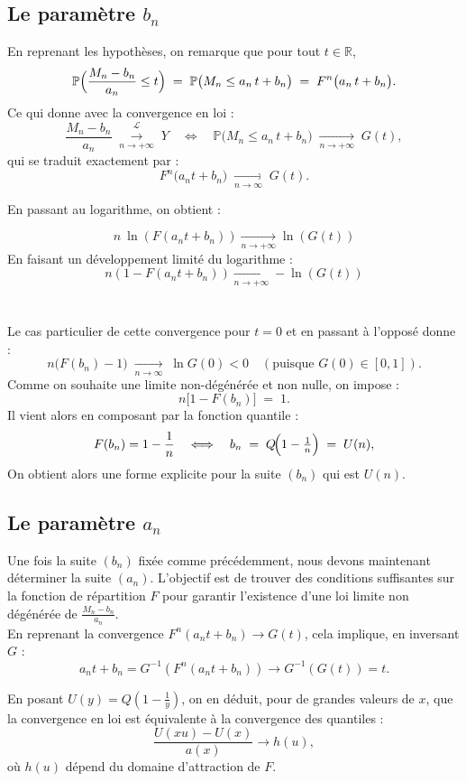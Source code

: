 \documentclass{article}
\theoremstyle{plain}
\theoremstyle{definition}
\theoremstyle{plain}
\begin{document}
\subsection{Le paramètre $b_n$}

\noindent En reprenant les hypothèses, on remarque que pour tout $t\in\mathbb R$,
\[
\mathbb{P}  \Bigl(\frac{M_n - b_n}{a_n} \le t\Bigr)
\;=\;
\mathbb{P} \bigl(M_n \le a_n\,t + b_n\bigr)
\;=\;
F^{n}\bigl(a_n\,t + b_n\bigr).
\]
Ce qui donne avec la convergence en loi :
\[
\frac{M_n - b_n}{a_n}\;\overset{\mathcal{L}}{\xrightarrow[n\to +\infty]{}}\;Y
\quad\Longleftrightarrow\quad
\mathbb{P} \bigl(M_n \le a_n\,t + b_n\bigr)
\;\xrightarrow[n\to +\infty]{} \; G(t),
\]
qui se traduit exactement par :
\[
F^{n} \bigl(a_n t + b_n\bigr)
\;\xrightarrow[n\to\infty]{}\;
G(t).
\]

\noindent En passant au logarithme, on obtient :

\[
n \: \ln (F(a_n t + b_n)) \xrightarrow[n\to +\infty]{} \ln (G(t))
\]
En faisant un développement limité du logarithme :
\[
n(1 - F(a_n t + b_n)) \xrightarrow[n\to +\infty]{} - \ln (G(t))
\]
\\
\\
Le cas particulier de cette convergence pour $t=0$ et en passant à l'opposé donne :
\[
n\bigl(F(b_n)-1\bigr)\;\xrightarrow[n\to\infty]{}\; \ln G(0) < 0
\quad(\text{puisque }G(0)\in[0,1]).
\]
Comme on souhaite une limite non-dégénérée et non nulle, on impose :
\[
n\bigl[1 - F(b_n)\bigr] \;=\; 1.
\]
Il vient alors en composant par la fonction quantile :
\[
F(b_n)=1-\frac1n
\quad\Longleftrightarrow\quad
b_n \;=\; Q\!\Bigl(1-\tfrac1n\Bigr)
\;=\;U(n),
\]
 On obtient alors une forme explicite pour la suite $(b_n)$ qui est $U(n)$.

\subsection{Le paramètre $a_n$}
\noindent Une fois la suite $(b_n)$ fixée comme précédemment, nous devons maintenant déterminer la suite $(a_n)$. L’objectif est de trouver des
 conditions suffisantes sur la fonction de répartition $F$ pour garantir l’existence d’une loi limite non dégénérée de $\frac{M_n - b_n}{a_n}$.
\\

\noindent En reprenant la convergence  $F^n(a_n t + b_n) \longrightarrow G(t)$, cela implique, en inversant \( G \) :
\[
a_n t + b_n = G^{-1}(F^n(a_n t + b_n)) \longrightarrow G^{-1}(G(t)) = t.
\]

\noindent En posant \( U(y) = Q\left(1 - \frac{1}{y}\right) \), on en déduit, pour de grandes valeurs de \( x \), que la convergence en loi est équivalente à la convergence des quantiles :
\[
\frac{U(xu) - U(x)}{a(x)} \longrightarrow h(u),
\]
où \( h(u) \) dépend du domaine d’attraction de \( F \). \\
\end{document}
